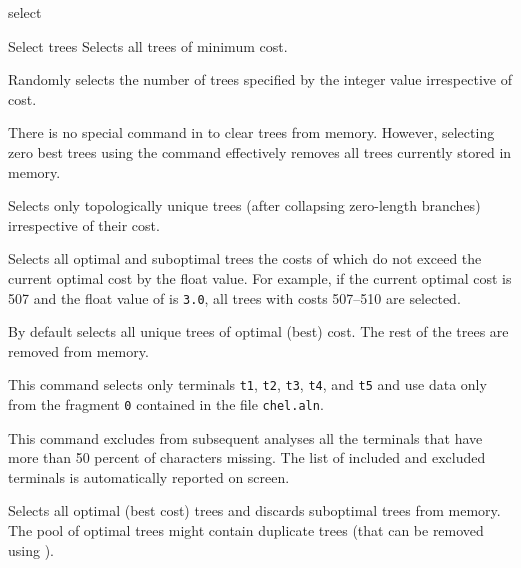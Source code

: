 \begin{command}{select}{}
\begin{arguments}
\begin{argumentgroup}{Select trees}
{Selects all trees of minimum cost.} 
{}

{Randomly selects the number of trees specified by the integer
value irrespective of cost.} 
{}

\begin{statement}
There is no special command in \poy to clear trees from memory. However,
selecting zero best trees using the command 
effectively removes all trees currently stored in memory.
\end{statement}

{Selects only topologically unique trees (after collapsing zero-length
branches) irrespective of their cost.} 
{}

{Selects all optimal and suboptimal trees the costs of which do not exceed
the current optimal cost by the float value. For example, if the current
optimal cost is 507 and the float value of  is
\texttt{3.0}, all trees with costs 507--510 are selected.} 
{}

\end{argumentgroup}

\end{arguments}

{By default \poy selects all unique trees of optimal (best) cost. The rest of
the trees are removed from memory.}

\begin{poyexamples}


{This command selects only terminals \texttt{t1}, \texttt{t2},
\texttt{t3}, \texttt{t4}, and \texttt{t5} and use data only from the
fragment \texttt{0} contained in the file \texttt{chel.aln}.}

{This command excludes from subsequent analyses all the terminals that
have more than 50 percent of characters missing. The list of included and excluded
terminals is automatically reported on screen.}

{Selects all optimal (best cost) trees and discards suboptimal trees from
memory. The pool of optimal trees might contain duplicate trees (that can
be removed using ).}


\end{poyexamples}
\end{command}
